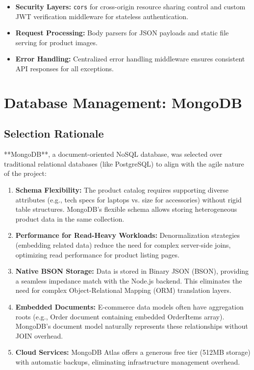 \documentclass[12pt, a4paper]{report}
\begin{document}
\begin{itemize}
    \item \textbf{Security Layers:} \texttt{cors} for cross-origin resource sharing control and custom JWT verification middleware for stateless authentication.
    \item \textbf{Request Processing:} Body parsers for JSON payloads and static file serving for product images.
    \item \textbf{Error Handling:} Centralized error handling middleware ensures consistent API responses for all exceptions.
\end{itemize}

\section{Database Management: MongoDB}

\subsection{Selection Rationale}

**MongoDB**, a document-oriented NoSQL database, was selected over traditional relational databases (like PostgreSQL) to align with the agile nature of the project:

\begin{enumerate}
    \item \textbf{Schema Flexibility:} 
    The product catalog requires supporting diverse attributes (e.g., tech specs for laptops vs. size for accessories) without rigid table structures. MongoDB's flexible schema allows storing heterogeneous product data in the same collection.
    
    \item \textbf{Performance for Read-Heavy Workloads:} 
    Denormalization strategies (embedding related data) reduce the need for complex server-side joins, optimizing read performance for product listing pages.
    
    \item \textbf{Native BSON Storage:} 
    Data is stored in Binary JSON (BSON), providing a seamless impedance match with the Node.js backend. This eliminates the need for complex Object-Relational Mapping (ORM) translation layers.
\end{enumerate}

\begin{enumerate}
    \setcounter{enumi}{3}
    \item \textbf{Embedded Documents:} E-commerce data models often have aggregation roots (e.g., Order document containing embedded OrderItems array). MongoDB's document model naturally represents these relationships without JOIN overhead.
    
    \item \textbf{Cloud Services:} MongoDB Atlas offers a generous free tier (512MB storage) with automatic backups, eliminating infrastructure management overhead.
\end{enumerate}
\end{document}
